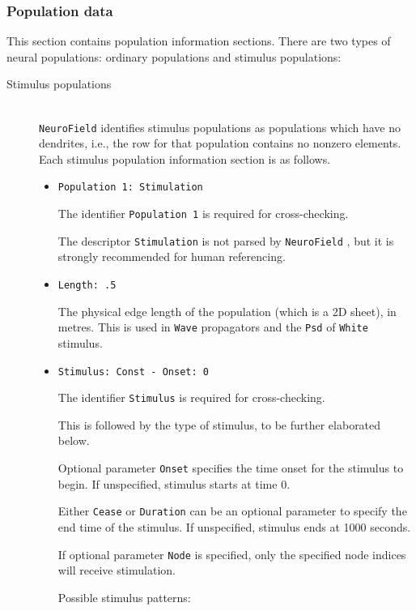 \documentclass[12pt,a4paper]{article}
\newcommand{\type}[1]{{\small\small\tt #1} }
\newcommand{\NF}[0]{\type{NeuroField}}
\begin{document}
\subsubsection{Population data}
\label{sec:pop_conf}
This section contains population information sections. There are two types of neural populations: ordinary populations and stimulus populations:
\begin{description}

\item[Stimulus populations]\ \\

\NF identifies stimulus populations as populations which have no dendrites, i.e., the row for that population contains no nonzero elements.  Each stimulus population information section is as follows.
\begin{itemize}
    \item \begin{lstlisting}
Population 1: Stimulation
    \end{lstlisting}
    The identifier \type{Population 1} is required for cross-checking.

    The descriptor \type{Stimulation} is not parsed by \NF, but it is strongly recommended for human referencing.
    \item
    \begin{lstlisting}
Length: .5
    \end{lstlisting}
    The physical edge length of the population (which is a 2D sheet), in metres. This is used in \type{Wave} propagators and the \type{Psd} of \type{White} stimulus.
    \item
    \begin{lstlisting}
Stimulus: Const - Onset: 0
    \end{lstlisting}
    The identifier \type{Stimulus} is required for cross-checking.

    This is followed by the type of stimulus, to be further elaborated below.

    Optional parameter \type{Onset} specifies the time onset for the stimulus to begin. If unspecified, stimulus starts at time 0.

    Either \type{Cease} or \type{Duration} can be an optional parameter to specify the end time of the stimulus. If unspecified, stimulus ends at 1000 seconds.

    If optional parameter \type{Node} is specified, only the specified node indices will receive stimulation.

    Possible stimulus patterns:


\end{itemize}
\end{description}
\end{document}

